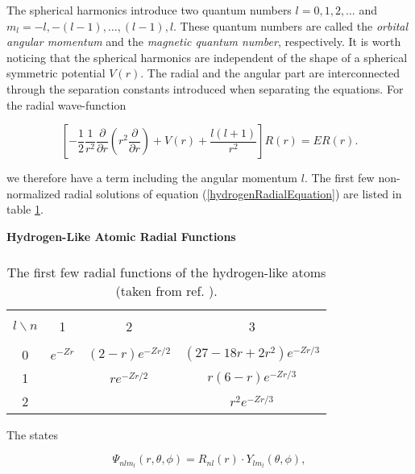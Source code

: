 The spherical harmonics introduce two quantum numbers 
$l = 0,1,2,\dots$ and $m_l = -l, -(l-1), \dots, (l-1), l$. 
These quantum numbers are called the 
\emph{orbital angular momentum} and the \emph{magnetic quantum
number}, respectively. It is worth noticing that the spherical
harmonics are independent of the shape of a spherical symmetric
potential $V(r)$. The radial and the angular part are interconnected
through the separation constants introduced when separating the
equations. For the radial wave-function 

\begin{equation}
  \left[ -\frac{1}{2} \frac{1}{r^2}\frac{\partial}{\partial r} 
    \left( r^2 \frac{\partial}{\partial r}\right)  
    + V(r) + \frac{l(l+1)}{r^2} \right]
  R(r) = E R(r).
\label{hydrogenRadialEquation}
\end{equation}

we therefore have a term including the angular momentum $l$.
The first few non-normalized radial solutions of equation
(\ref{hydrogenRadialEquation}) are listed in table
\ref{hydrogenRadialFunctions}.
\newline


\begin{table}[hbtp]
\begin{center} {\large \bf Hydrogen-Like Atomic Radial Functions} \\ 
$\phantom{a}$ \\
\begin{tabular}{cccc}
\hline\\ 
$l\backslash n$ & \phantom{AA}1\phantom{AA}
& \phantom{AA}2\phantom{AA} & \phantom{AA}3\phantom{AA}  \\ 
\hline\\ 
0 & $e^{-Zr}$ & $(2-r)e^{-Zr/2}$ & $(27-18r+2r^2)e^{-Zr/3}$ \\[7pt]
1 & & $re^{-Zr/2}$ & $r(6-r)e^{-Zr/3}$\\[7pt]
2 & & & $r^2e^{-Zr/3}$ \\[7pt]
\hline
\end{tabular} 
\end{center}
\caption{The first few radial functions of the hydrogen-like atoms
  (taken from ref. \cite{rohlf1994}).} 
\label{hydrogenRadialFunctions}
\end{table}

The states

\begin{equation}
  \Psi_{nlm_l}(r,\theta, \phi) =R_{nl}(r) \cdot Y_{lm_l}(\theta,\phi),
\label{totalHydrogenWavefunction}
\end{equation}

